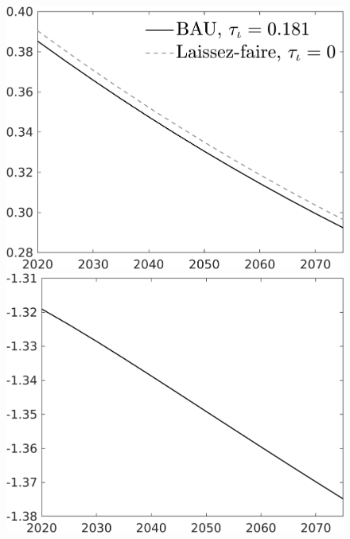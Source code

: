 \documentclass[12pt]{article}
\begin{document}
\begin{figure}[h!!]
\begin{minipage}[]{0.32\textwidth}
	\end{minipage}	
	\begin{minipage}[]{0.32\textwidth}
		\includegraphics[width=1\textwidth]{../../codding_model/own_basedOnFried/optimalPol_010922_revision/figures/all_13Sept22/CompTaul_Equlab_LFBAU_Reg0_LgLf_spillover0_nsk0_xgr0_knspil1_sep1_countec0_GovRev0_etaa0.79_lgd1.png}
	\end{minipage}	
	\begin{minipage}[]{0.32\textwidth}
		\includegraphics[width=1\textwidth]{../../codding_model/own_basedOnFried/optimalPol_010922_revision/figures/all_13Sept22/CompTaul_Equlab_LFBAUPer_Reg0_LgLf_spillover0_nsk0_xgr0_knspil1_sep1_countec0_GovRev0_etaa0.79.png}

\end{minipage}
\end{figure}
\end{document}
